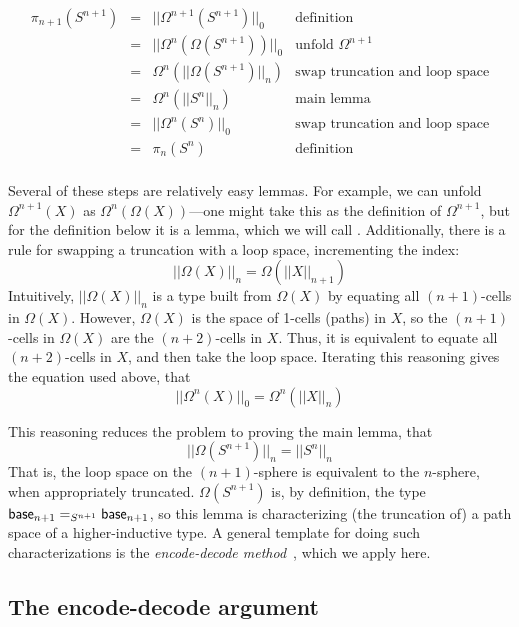 \[
\begin{array}{rcll}
\pi_{n+1}(S^{n+1}) & = & ||\Omega^{n+1}(S^{n+1})||_0 & \text{definition}\\
                  & = & ||\Omega^{n}(\Omega(S^{n+1}))||_0 & \text{unfold $\Omega^{n+1}$} \\
                  & = & \Omega^{n}(||\Omega(S^{n+1})||_n) & \text{swap truncation and loop space} \\
                  & = & \Omega^{n}(||S^{n}||_n) & \text{main lemma} \\
                  & = & ||\Omega^{n}(S^{n})||_0 & \text{swap truncation and loop space} \\
                  & = & \pi_n(S^n) & \text{definition} \\
\end{array}
\]

Several of these steps are relatively easy lemmas.  For example, we can
unfold $\Omega^{n+1}(X)$ as $\Omega^n(\Omega(X))$---one might
take this as the definition of $\Omega^{n+1}$, but for the definition
below it is a lemma, which we will call .  Additionally, there is a rule for swapping
a truncation with a loop space, incrementing the index:
\[
||\Omega(X)||_n = \Omega(||X||_{n+1})
\]
Intuitively, $||\Omega(X)||_n$ is a type built from $\Omega(X)$ by
equating all $(n+1)$-cells in $\Omega(X)$.  However, $\Omega(X)$ is the
space of 1-cells (paths) in $X$, so the $(n+1)$-cells in $\Omega(X)$ are the
$(n+2)$-cells in $X$.  Thus, it is equivalent to equate all $(n+2)$-cells in
$X$, and then take the loop space.  Iterating this reasoning gives the
equation used above, that
\[
||\Omega^n(X)||_0 = \Omega^n(||X||_{n})
\]

This reasoning reduces the problem to proving the main lemma, that 
\[
||\Omega(S^{n+1})||_n = ||S^{n}||_n
\]
That is, the loop space on the $(n+1)$-sphere is equivalent to the
$n$-sphere, when appropriately truncated.  $\Omega(S^{n+1})$ is, by
definition, the type $\mathsf{base}_{n+1} =_{S^{n+1}} \mathsf{base}_{n+1}$, 
so this lemma is characterizing (the truncation of) a path space of a
higher-inductive type.  A general template for doing such
characterizations is the 
\emph{encode-decode method}~\citep[Section 8.9]{uf13hott-book}, which we
apply here.  

\subsection{The encode-decode argument}
\label{sec:encode-decode}

